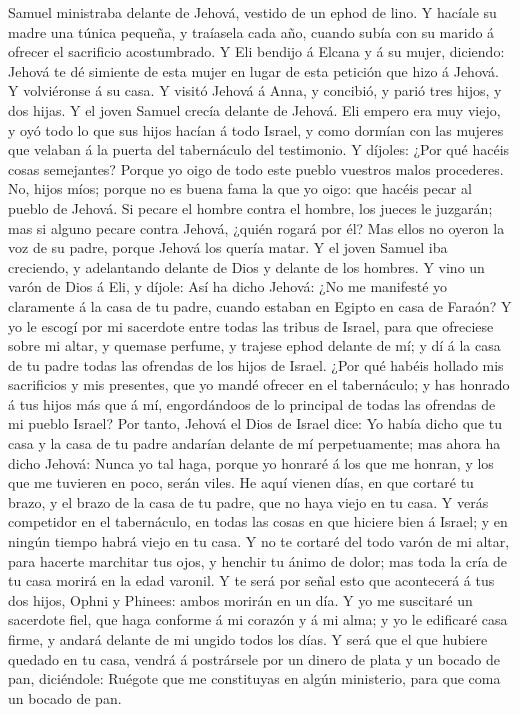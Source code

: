 Samuel ministraba delante de Jehová, vestido de un ephod de lino.
 Y hacíale su madre una túnica pequeña, y traíasela cada
año, cuando subía con su marido á ofrecer el sacrificio acostumbrado.
 Y Eli bendijo á Elcana y á su mujer, diciendo: Jehová te
dé simiente de esta mujer en lugar de esta petición que hizo á Jehová. Y
volviéronse á su casa.  Y visitó Jehová á Anna, y
concibió, y parió tres hijos, y dos hijas. Y el joven Samuel crecía
delante de Jehová.  Eli empero era muy viejo, y oyó todo
lo que sus hijos hacían á todo Israel, y como dormían con las mujeres
que velaban á la puerta del tabernáculo del testimonio. 
Y díjoles: ¿Por qué hacéis cosas semejantes? Porque yo oigo de todo este
pueblo vuestros malos procederes.  No, hijos míos; porque
no es buena fama la que yo oigo: que hacéis pecar al pueblo de Jehová.
 Si pecare el hombre contra el hombre, los jueces le
juzgarán; mas si alguno pecare contra Jehová, ¿quién rogará por él? Mas
ellos no oyeron la voz de su padre, porque Jehová los quería matar.
 Y el joven Samuel iba creciendo, y adelantando delante
de Dios y delante de los hombres.  Y vino un varón de
Dios á Eli, y díjole: Así ha dicho Jehová: ¿No me manifesté yo
claramente á la casa de tu padre, cuando estaban en Egipto en casa de
Faraón?  Y yo le escogí por mi sacerdote entre todas las
tribus de Israel, para que ofreciese sobre mi altar, y quemase perfume,
y trajese ephod delante de mí; y dí á la casa de tu padre todas las
ofrendas de los hijos de Israel.  ¿Por qué habéis hollado
mis sacrificios y mis presentes, que yo mandé ofrecer en el tabernáculo;
y has honrado á tus hijos más que á mí, engordándoos de lo principal de
todas las ofrendas de mi pueblo Israel?  Por tanto,
Jehová el Dios de Israel dice: Yo había dicho que tu casa y la casa de
tu padre andarían delante de mí perpetuamente; mas ahora ha dicho
Jehová: Nunca yo tal haga, porque yo honraré á los que me honran, y los
que me tuvieren en poco, serán viles.  He aquí vienen
días, en que cortaré tu brazo, y el brazo de la casa de tu padre, que no
haya viejo en tu casa.  Y verás competidor en el
tabernáculo, en todas las cosas en que hiciere bien á Israel; y en
ningún tiempo habrá viejo en tu casa.  Y no te cortaré
del todo varón de mi altar, para hacerte marchitar tus ojos, y henchir
tu ánimo de dolor; mas toda la cría de tu casa morirá en la edad
varonil.  Y te será por señal esto que acontecerá á tus
dos hijos, Ophni y Phinees: ambos morirán en un día.  Y
yo me suscitaré un sacerdote fiel, que haga conforme á mi corazón y á mi
alma; y yo le edificaré casa firme, y andará delante de mi ungido todos
los días.  Y será que el que hubiere quedado en tu casa,
vendrá á postrársele por un dinero de plata y un bocado de pan,
diciéndole: Ruégote que me constituyas en algún ministerio, para que
coma un bocado de pan.

